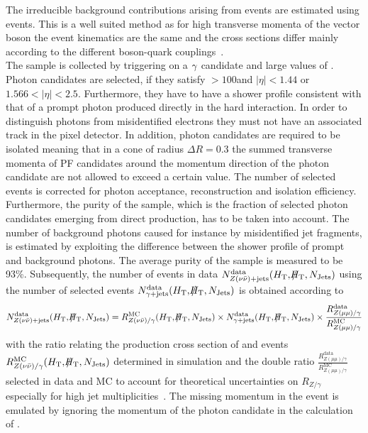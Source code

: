 The irreducible background contributions arising from \ZInvJets events are estimated using \photonJets events. This is a well suited method as for high transverse momenta of the vector boson the event kinematics are the same and the cross sections differ mainly according to the different boson-quark couplings~\cite{Ask:2011xf, Bern:2011pa, Bern:2012vx}. \\
The \photonJets sample is collected by triggering on a $\gamma$ candidate and large values of \HT. Photon candidates are selected, if they satisfy \pt$ > 100$\gev and $|\eta| < 1.44$ or $1.566 < |\eta| < 2.5$. Furthermore, they have to have a shower profile consistent with that of a prompt photon produced directly in the hard interaction. In order to distinguish photons from misidentified electrons they must not have an associated track in the pixel detector. In addition, photon candidates are required to be isolated meaning that in a cone of radius $\Delta R = 0.3$ the summed transverse momenta of PF candidates around the momentum direction of the photon candidate are not allowed to exceed a certain value. The number of selected \photonJets events is corrected for photon acceptance, reconstruction and isolation efficiency. Furthermore, the purity of the \photonJets sample, which is the fraction of selected photon candidates emerging from direct production, has to be taken into account. The number of background photons caused for instance by misidentified jet fragments, is estimated by exploiting the difference between the shower profile of prompt and background photons. The average purity of the \photonJets sample is measured to be 93\%. Subsequently, the number of \ZInvJets events in data $N_{Z(\nu\bar{\nu})+\text{jets}}^{\text{data}} (H_{\text{T}}, \slash\mkern-12mu{H}_{\text{T}}, N_{\text{Jets}})$ using the number of selected \photonJets events $N_{\gamma+\text{jets}}^{\text{data}} (H_{\text{T}},\slash\mkern-12mu{H}_{\text{T}},N_{\text{Jets}})$ is obtained according to
\begin{equation*}
N_{\ZInvJets}^{\text{data}} (\HT, \MHT, \NJets) = R^{\text{MC}}_{Z(\nu\bar{\nu})/\gamma} (\HT,\MHT,\NJets)
                                                        \times 
                                                       N_{\photonJets}^{\text{data}} (\HT,\MHT,\NJets)
                                                       \times 
                                                       \frac{R_{Z(\mu\mu)/\gamma}^{\text{data}}}{R_{Z(\mu\mu)/\gamma}^{\text{MC}}}
\label{eqn:photoncorr}
\end{equation*}
with the ratio relating the production cross section of \ZInvJets and \photonJets events $R^{\text{MC}}_{Z(\nu\bar{\nu})/\gamma} (H_{\text{T}},\slash\mkern-12mu{H}_{\text{T}},N_{\text{Jets}})$ determined in simulation and the double ratio $\frac{R_{Z(\mu\mu)/\gamma}^{\text{data}}}{R_{Z(\mu\mu)/\gamma}^{\text{MC}}}$ selected in data and MC to account for theoretical uncertainties on $R_{Z/\gamma}$ especially for high jet multiplicities~\cite{Bern:2011pa, Bern:2012vx}. The missing momentum in the event is emulated by ignoring the momentum of the photon candidate in the calculation of \MHT. \\
